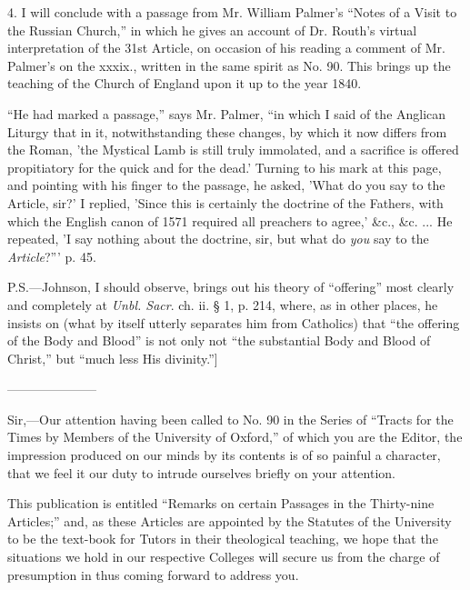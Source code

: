4. I will conclude with a passage from Mr. William Palmer's
``Notes of a Visit to the Russian Church,'' in which he gives
an account of Dr. Routh's virtual interpretation of the 31st Article,
on occasion of his reading a comment of Mr. Palmer's on the xxxix.,
written in the same spirit as No. 90. This brings up the teaching of
the Church of England upon it up to the year 1840.

``He had marked a passage,'' says Mr. Palmer, ``in
which I said of the Anglican Liturgy that in it, notwithstanding these
changes, by which it now differs from the Roman, 'the Mystical Lamb is
still truly immolated, and a sacrifice is offered propitiatory for the
quick and for the dead.' Turning to his mark at this page, and
pointing with his finger to the passage, he asked, 'What do you say to
the Article, sir?' I replied, 'Since this is certainly the doctrine of
the Fathers, with which the English canon of 1571 required all
preachers to agree,' \&c., \&c. ... He repeated, 'I say nothing
about the doctrine, sir, but what do \emph{you} say to the \emph{Article}?'''
p. 45.

P.S.—Johnson, I should observe, brings out his theory of
``offering'' most clearly and completely at \emph{Unbl. Sacr}.
ch. ii. § 1, p. 214, where, as in other places, he insists on (what
by itself utterly separates him from Catholics) that ``the
offering of the Body and Blood'' is not only not ``the
substantial Body and Blood of Christ,'' but ``much less His
divinity.'']


———————


Sir,—Our attention having been called to No. 90 in the
Series of ``Tracts for the Times by Members of the University of
Oxford,'' of which you are the Editor, the impression produced on
our minds by its contents is of so painful a character, that we feel
it our duty to intrude ourselves briefly on your attention.

This publication is entitled ``Remarks on certain Passages in
the Thirty-nine Articles;'' and, as these Articles are appointed
by the Statutes of the University to be the text-book for Tutors in
their theological teaching, we hope that the situations we hold in our
respective Colleges will secure us from the charge of presumption in
thus coming forward to address you.

